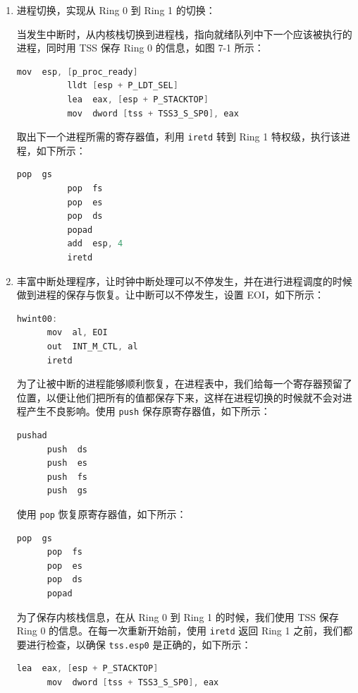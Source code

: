 \begin{enumerate}
    \item 进程切换，实现从 Ring 0 到 Ring 1 的切换：\par
        当发生中断时，从内核栈切换到进程栈，指向就绪队列中下一个应该被执行的进程，同时用 TSS 保存 Ring 0 的信息，如图 7-1 所示：
        \begin{lstlisting}[language = C]
          mov  esp, [p_proc_ready]    
          lldt [esp + P_LDT_SEL]
          lea  eax, [esp + P_STACKTOP]
          mov  dword [tss + TSS3_S_SP0], eax
        \end{lstlisting}
        
        取出下一个进程所需的寄存器值，利用 \texttt{iretd} 转到 Ring 1 特权级，执行该进程，如下所示：
        \begin{lstlisting}[language = C]
          pop  gs
          pop  fs
          pop  es
          pop  ds
          popad
          add  esp, 4
          iretd
        \end{lstlisting}
    
    \item 丰富中断处理程序，让时钟中断处理可以不停发生，并在进行进程调度的时候做到进程的保存与恢复。让中断可以不停发生，设置 EOI，如下所示：
    \begin{lstlisting}[language = C]
    hwint00:
      mov  al, EOI
      out  INT_M_CTL, al
      iretd
    \end{lstlisting}
    
    为了让被中断的进程能够顺利恢复，在进程表中，我们给每一个寄存器预留了位置，以便让他们把所有的值都保存下来，这样在进程切换的时候就不会对进程产生不良影响。使用 \texttt{push} 保存原寄存器值，如下所示：
    \begin{lstlisting}[language = C]
      pushad
      push  ds
      push  es
      push  fs
      push  gs
    \end{lstlisting}
    
    使用 \texttt{pop} 恢复原寄存器值，如下所示：
    \begin{lstlisting}[language = C]
      pop  gs
      pop  fs
      pop  es
      pop  ds
      popad
    \end{lstlisting}

    
    为了保存内核栈信息，在从 Ring 0 到 Ring 1 的时候，我们使用 TSS 保存 Ring 0 的信息。在每一次重新开始前，使用 \texttt{iretd} 返回 Ring 1 之前，我们都要进行检查，以确保 \texttt{tss.esp0} 是正确的，如下所示：
    \begin{lstlisting}[language = C]
      lea  eax, [esp + P_STACKTOP]
      mov  dword [tss + TSS3_S_SP0], eax
    \end{lstlisting}
    

\end{enumerate}
